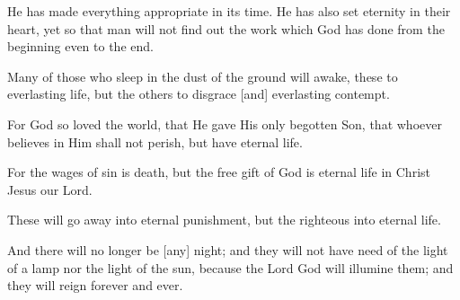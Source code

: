 \begin{scripture}[Ecclesiastes 3:11]
         He has made everything appropriate in its time. 
        He has also set eternity in their heart, yet so that man 
        will not find out the work which God has done from the 
        beginning even to the end.
\end{scripture}

\vspace{2\baselineskip}

\begin{scripture}[Daniel 12:2]
     Many of those who sleep in the dust of the ground will awake, these to everlasting 
    life, but the others to disgrace [and] everlasting contempt.
\end{scripture}

\vspace{2\baselineskip}

\begin{scripture}[John 3:16]
     For God so loved the world, that He gave His
        only begotten Son, that whoever believes in Him shall not perish, but have eternal life.
\end{scripture}

\vspace{2\baselineskip}

\begin{scripture}[Romans 6:23]
         For the wages of sin is death, but the free gift of God is eternal life in Christ Jesus our Lord.
\end{scripture}

\vspace{2\baselineskip}

\begin{scripture}[Matthew 25:46]
         These will go away into eternal punishment, but the righteous into eternal life.
\end{scripture}

\vspace{2\baselineskip}

\begin{scripture}[Revelation 22:5]
         And there will no longer be [any] night; and they will not have need of the light 
        of a lamp nor the light of the sun, because the Lord God will illumine them; and they will 
        reign forever and ever.
\end{scripture}

